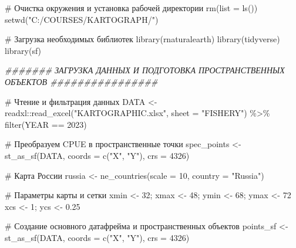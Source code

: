 \documentclass[
  letterpaper,
  DIV=11,
  numbers=noendperiod]{scrreprt}
\newenvironment{Shaded}{\begin{snugshade}}{\end{snugshade}}
\newcommand{\AttributeTok}[1]{\textcolor[rgb]{0.40,0.45,0.13}{#1}}
\newcommand{\CommentTok}[1]{\textcolor[rgb]{0.37,0.37,0.37}{#1}}
\newcommand{\DecValTok}[1]{\textcolor[rgb]{0.68,0.00,0.00}{#1}}
\newcommand{\DocumentationTok}[1]{\textcolor[rgb]{0.37,0.37,0.37}{\textit{#1}}}
\newcommand{\FloatTok}[1]{\textcolor[rgb]{0.68,0.00,0.00}{#1}}
\newcommand{\FunctionTok}[1]{\textcolor[rgb]{0.28,0.35,0.67}{#1}}
\newcommand{\NormalTok}[1]{\textcolor[rgb]{0.00,0.23,0.31}{#1}}
\newcommand{\OtherTok}[1]{\textcolor[rgb]{0.00,0.23,0.31}{#1}}
\newcommand{\SpecialCharTok}[1]{\textcolor[rgb]{0.37,0.37,0.37}{#1}}
\newcommand{\StringTok}[1]{\textcolor[rgb]{0.13,0.47,0.30}{#1}}
\begin{document}
\begin{Shaded}
\begin{Highlighting}[]
\CommentTok{\# Очистка окружения и установка рабочей директории}
\FunctionTok{rm}\NormalTok{(}\AttributeTok{list =} \FunctionTok{ls}\NormalTok{())}
\FunctionTok{setwd}\NormalTok{(}\StringTok{"C:/COURSES/KARTOGRAPH/"}\NormalTok{)}

\CommentTok{\# Загрузка необходимых библиотек}
\FunctionTok{library}\NormalTok{(rnaturalearth)}
\FunctionTok{library}\NormalTok{(tidyverse)}
\FunctionTok{library}\NormalTok{(sf)}

\DocumentationTok{\#\#\#\#\#\#\# ЗАГРУЗКА ДАННЫХ И ПОДГОТОВКА ПРОСТРАНСТВЕННЫХ ОБЪЕКТОВ \#\#\#\#\#\#\#\#\#\#\#\#\#\#\#\#}

\CommentTok{\# Чтение и фильтрация данных}
\NormalTok{DATA }\OtherTok{\textless{}{-}}\NormalTok{ readxl}\SpecialCharTok{::}\FunctionTok{read\_excel}\NormalTok{(}\StringTok{"KARTOGRAPHIC.xlsx"}\NormalTok{, }\AttributeTok{sheet =} \StringTok{"FISHERY"}\NormalTok{) }\SpecialCharTok{\%\textgreater{}\%} 
  \FunctionTok{filter}\NormalTok{(YEAR }\SpecialCharTok{==} \DecValTok{2023}\NormalTok{)}

\CommentTok{\# Преобразуем CPUE в пространственные точки}
\NormalTok{spec\_points }\OtherTok{\textless{}{-}} \FunctionTok{st\_as\_sf}\NormalTok{(DATA, }\AttributeTok{coords =} \FunctionTok{c}\NormalTok{(}\StringTok{"X"}\NormalTok{, }\StringTok{"Y"}\NormalTok{), }\AttributeTok{crs =} \DecValTok{4326}\NormalTok{)}

\CommentTok{\# Карта России}
\NormalTok{russia }\OtherTok{\textless{}{-}} \FunctionTok{ne\_countries}\NormalTok{(}\AttributeTok{scale =} \DecValTok{10}\NormalTok{, }\AttributeTok{country =} \StringTok{"Russia"}\NormalTok{) }

\CommentTok{\# Параметры карты и сетки}
\NormalTok{xmin }\OtherTok{\textless{}{-}} \DecValTok{32}\NormalTok{; xmax }\OtherTok{\textless{}{-}} \DecValTok{48}\NormalTok{; ymin }\OtherTok{\textless{}{-}} \DecValTok{68}\NormalTok{; ymax }\OtherTok{\textless{}{-}} \DecValTok{72}
\NormalTok{xcs }\OtherTok{\textless{}{-}} \DecValTok{1}\NormalTok{; ycs }\OtherTok{\textless{}{-}} \FloatTok{0.25}


\CommentTok{\# Создание основного датафрейма и пространственных объектов}
\NormalTok{points\_sf }\OtherTok{\textless{}{-}} \FunctionTok{st\_as\_sf}\NormalTok{(DATA, }\AttributeTok{coords =} \FunctionTok{c}\NormalTok{(}\StringTok{"X"}\NormalTok{, }\StringTok{"Y"}\NormalTok{), }\AttributeTok{crs =} \DecValTok{4326}\NormalTok{)}


\end{Highlighting}
\end{Shaded}
\end{document}
